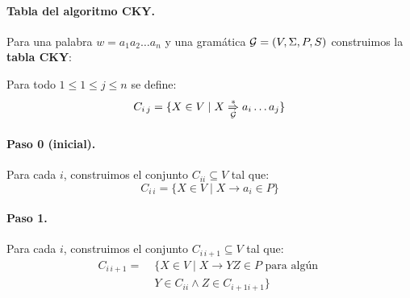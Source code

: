 \paragraph{Tabla del algoritmo CKY.} Para una palabra $w = a_1 a_2 \ldots a_n$ y una gramática $\mathcal{G} = (V, \Sigma, P, S)$ construimos la \textbf{tabla CKY}:


Para todo $1 \leq 1 \leq j \leq n$ se define:
$$
    C_{i\, j} = \{X \in V \mid X \underset{\mathcal{G}}{\overset{*}{\Rightarrow}} a_i \ldots a_j\}
$$

\begin{multicols}{2}

    \paragraph{Paso 0 (inicial).} Para cada $i$, construimos el conjunto $C_{ii} \subseteq V$ tal que:
    $$
        C_{i\,i} = \{X \in V \mid X \to a_i \in P\}
    $$

    \paragraph{Paso 1.} Para cada $i$, construimos el conjunto $C_{i\, i +1} \subseteq V$ tal que:
    \begin{align*}
        C_{i\, i+1} =\; & \{X \in V \mid X \to YZ \in P \text{ para algún } \\
                        & Y \in C_{ii} \wedge Z \in C_{i+1 i+1}\}
    \end{align*}

\end{multicols}

